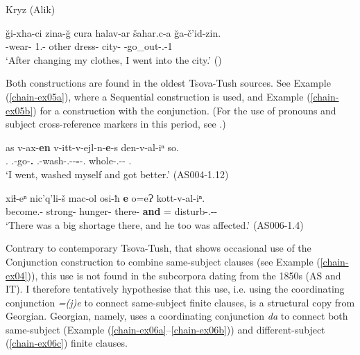 \begin{exe}
	\ex\label{chain-ex10}
	Kryz (Alik)
	
		\gll \u{g}i-xha-ci zina-\u{g} cura halav-ar šahar.c-a \u{g}a-č'id-zin. \\
		{\Pv}-wear-{\Seq} 1.{\Refl}-{\Super} other dress-{\Pl} city-{\In} {\Pv}-go\_out-{\Aor}.{\M}-1\\
		\trans `After changing my clothes, I went into the city.'
		\hfill (\cite[325]{authier2009kryzgrammar})
	
\end{exe}

Both constructions are found in the oldest Tsova-Tush sources. See Example (\ref{chain-ex05a}), where a Sequential construction is used, and Example (\ref{chain-ex05b}) for a construction with the conjunction. (For the use of pronouns and subject cross-reference markers in this period, see .)



\begin{exe}
	\ex\label{chain-ex05}
	\begin{xlist}
		
		
			\ex\label{chain-ex05a}
			\gll as v-ax-\textbf{en} v-itt-v-ejl-n-\textbf{e}-s den-v-al-iⁿ so. \\
			{\Fsg}.{\Erg} {\M}.{\Sg}-go-\textbf{{\Aor}.{\Seq}} {\M}.{\Sg}-wash-{\M}.{\Sg}-{\Intr}-{\Aor}\textbf{-{\Seq}}-{\Fsg}.{\Nom} whole-{\M}.{\Sg}-{\Intr}-{\Aor} {\Fsg}.{\Nom} \\
			\trans `I went, washed myself and got better.'
			\hfill (AS004-1.12)
		
		
		
			\ex\label{chain-ex05b}
			\gll  xiɬ-eⁿ nic'q'li-š mac-ol osi-ħ \textbf{e} o=eɁ kott-v-al-iⁿ. \\
			become.{\Pfv}-{\Aor} strong-{\Adv} hunger-{\Nmlz} there-{\Ess} \textbf{and} {\Dist}={\Emph} disturb-{\M}.{\Sg}-{\Intr}-{\Aor} \\
			\trans `There was a big shortage there, and he too was affected.'
			\hfill (AS006-1.4)
		
		
	\end{xlist}
\end{exe}

Contrary to contemporary Tsova-Tush, that shows occasional use of the Conjunction construction to combine same-subject clauses (see Example (\ref{chain-ex04})), this use is not found in the  subcorpora dating from the 1850s (AS and IT). I therefore tentatively hypothesise that this use, i.e. using the coordinating conjunction \textit{=(j)e} to connect same-subject finite clauses, is a structural copy from Georgian. Georgian, namely, uses a coordinating conjunction \textit{da} to connect both same-subject (Example (\ref{chain-ex06a}--\ref{chain-ex06b})) and different-subject (\ref{chain-ex06c}) finite clauses.

